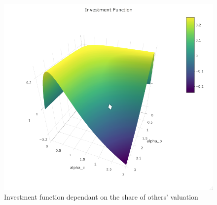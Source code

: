 \begin{figure}[H]
    \centering
    \includegraphics[scale=0.5]{graphs/Investment_Func.png}
    \caption{Investment function dependant on the share of others' valuation}
    \label{fig:invest_func}
\end{figure}

